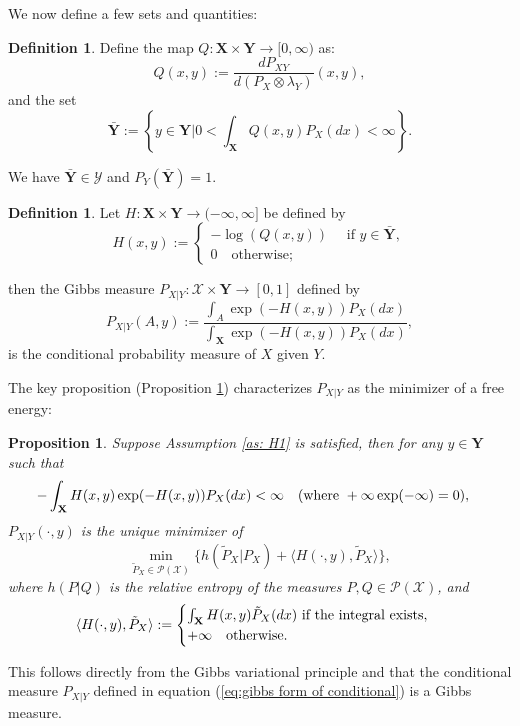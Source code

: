 \documentclass[12pt]{amsart}
\newtheorem{proposition}[theorem]{Proposition}
\theoremstyle{definition}
\newtheorem{definition}[theorem]{Definition}
\theoremstyle{remark}
\begin{document}
We now define a few sets and quantities:
\begin{definition}
    Define the map $Q:\mathbf{X\times Y}\to[0,\infty)$ as:
    \[
       Q(x,y) := \frac{dP_{XY}}{d(P_X\otimes\lambda_Y)}(x,y),
    \]
    and the set
    \[
        \bar{\mathbf{Y}} := \left\{y\in\mathbf{Y}\vert 0<\int_\mathbf{X}Q(x,y)P_X(dx)<\infty\right\}.
    \]
\end{definition}
We have $\bar{\mathbf{Y}}\in\mathcal{Y}$ and $P_Y(\mathbf{\bar{Y}})=1$.
\begin{definition}
    Let $H:\mathbf{X\times Y}\to(-\infty,\infty]$ be defined by
    \begin{equation*}
        H(x,y) :=\begin{cases}
            -\log(Q(x,y))\quad \text{ if } y\in\mathbf{\bar{Y}},\\
            0 \quad \text{otherwise};
        \end{cases}
    \end{equation*}
\end{definition}
then the Gibbs measure $P_{X|Y}:\mathcal{X}\times\mathbf{Y}\to[0,1]$ defined by
\begin{equation}\label{eq:gibbs form of conditional}
    P_{X|Y}(A,y):=\frac{\int_A\exp(-H(x,y))P_X(dx)}{\int_\mathbf{X}\exp(-H(x,y))P_X(dx)},
\end{equation}
is the conditional probability measure of $X$ given $Y$.

The key proposition \cite[Proposition 2.1]{mitter2003variational} (Proposition \ref{prop:gibbs var}) characterizes $P_{X|Y}$ as the minimizer of a free energy:

\begin{proposition}\label{prop:gibbs var}
    Suppose Assumption \ref{as: H1} is satisfied, then for any $y\in\mathbf{Y}$ such that
    \begin{align*}
        -\int_\mathbf{X}H(x,y)\exp(-H(x,y))P_X(dx)&<\infty \quad (\textnormal{where } +\infty\exp(-\infty)=0),
    \end{align*}
    $P_{X|Y}(\cdot,y)$ is the unique minimizer of
    \begin{equation}\label{eq:free energy}
        \min_{\tilde{P}_X\in\mathcal{P}(\mathcal{X})}\bigl\{h(\tilde{P}_X\vert P_X)+\langle H(\cdot,y),\tilde{P}_X\rangle\bigr\},
    \end{equation}
    where $h(P\vert Q)$ is the relative entropy of the measures $P,Q\in\mathcal{P}(\mathcal{X})$, and
    \begin{equation*}
        \langle H(\cdot,y),\tilde{P}_X\rangle := \begin{cases}
            \int_\mathbf{X}H(x,y)\tilde{P}_X(dx) \,\, \textnormal{if the integral exists},\\
            +\infty \quad \textnormal{otherwise}.
        \end{cases}
    \end{equation*}
\end{proposition}
This follows directly from the Gibbs variational principle and that the conditional measure $P_{X|Y}$ defined in equation (\ref{eq:gibbs form of conditional}) is a Gibbs measure.
\end{document}
